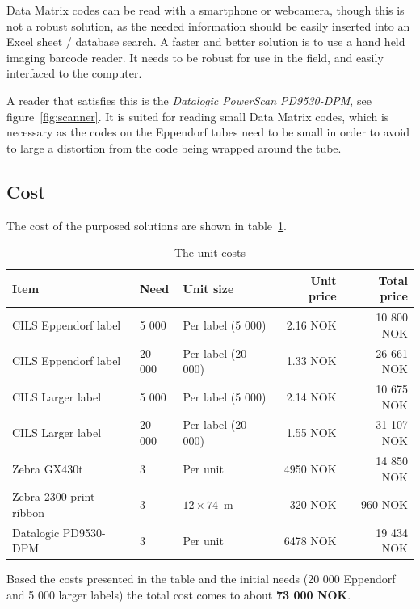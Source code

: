 \documentclass[a4paper,english, 11pt]{article}
\begin{document}
Data Matrix codes can be read with a smartphone or webcamera, though this is not a robust solution, as the needed information should be easily inserted into an Excel sheet / database search. A faster and better solution is to use a hand held imaging barcode reader. It needs to be robust for use in the field, and easily interfaced to the computer.

A reader that satisfies this is the \emph{Datalogic PowerScan PD9530-DPM}, see figure~\ref{fig:scanner}. It is suited for reading small Data Matrix codes, which is necessary as the codes on the Eppendorf tubes need to be small in order to avoid to large a distortion from the code being wrapped around the tube. 

\subsection{Cost} %
\label{sub:Cost}
The cost of the purposed solutions are shown in table~\ref{tab:costs}.
\begin{table}[htb]
    
    \caption{\label{tab:costs}The unit costs}
    \begin{tabular}{lllrr}
        \hline
        \textbf{Item} & Need & \textbf{Unit size} & \textbf{Unit price} & \textbf{Total price} \\
        \hline
        CILS Eppendorf label    & 5 000     & Per label  (5 000)    & 2.16 NOK  & 10 800 NOK\\ 
        CILS Eppendorf label    & 20 000    & Per label  (20 000)   & 1.33 NOK  & 26 661 NOK\\ 
        CILS Larger label       & 5 000     & Per label  (5 000)    & 2.14 NOK  & 10 675 NOK\\ 
        CILS Larger label       & 20 000    & Per label  (20 000)   & 1.55 NOK  & 31 107 NOK\\ 
        Zebra GX430t            & 3         & Per unit              & 4950 NOK  & 14 850 NOK\\ 
        Zebra 2300 print ribbon & 3         & $12\times74$~m         & 320 NOK   & 960 NOK\\ 
        Datalogic PD9530-DPM    & 3         & Per unit              & 6478 NOK  & 19 434 NOK\\ 
        \hline
    \end{tabular}
\end{table}


Based the costs presented in the table and the initial needs (20 000 Eppendorf and 5 000 larger labels) the total cost comes to about \textbf{73 000 NOK}.
\end{document}
